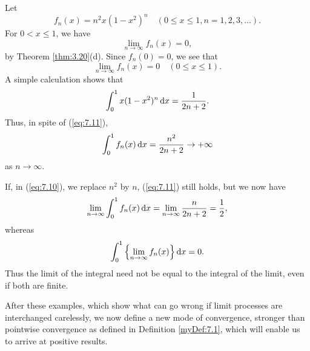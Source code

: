 \begin{myExample}
    \label{myExample:7.6}
    Let 
    \begin{equation}
        \label{eq:7.10}
        f_n(x) = n^2 x(1-x^2)^n
        \quad 
        (0 \leq x \leq 1, n = 1,2,3,\dots).
    \end{equation}
    For $0 < x \leq 1$, we have 
    \begin{equation*}
        \lim_{n \to \infty} f_n (x) = 0,
    \end{equation*}
    by Theorem \ref{thm:3.20}(d). Since $f_n(0) = 0$, we see that
    \begin{equation}
        \label{eq:7.11}
        \lim_{n \to \infty} f_n (x) = 0
        \quad 
        (0 \leq x \leq 1).
    \end{equation}
    A simple calculation shows that 
    \begin{equation*}
        \int_{0}^{1} x(1-x^2)^n \d x = \frac{1}{2n+2}.
    \end{equation*}
    Thus, in spite of (\ref{eq:7.11}),
    \begin{equation*}
        \int_{0}^{1} f_n(x) \d x = \frac{n^2}{2n+2} \rightarrow +\infty
    \end{equation*}
    as $n \rightarrow \infty$.

    If, in (\ref{eq:7.10}), we replace $n^2$ by $n$,
    (\ref{eq:7.11}) still holds, but we now have 
    \begin{equation*}
        \lim_{n \to \infty} \int_{0}^{1} f_n (x) \d x = 
        \lim_{n \to \infty} \frac{n}{2n+2} = \frac{1}{2},
    \end{equation*}
    whereas 
    \begin{equation*}
        \int_{0}^{1} \left\{ \lim_{n \to \infty} f_n (x) \right\} \d x = 0.
    \end{equation*}
    Thus the limit of the integral need not be equal to the integral of the limit, even if both are finite.
\end{myExample}
After these examples, which show what can go wrong if limit processes
are interchanged carelessly, 
we now define a new mode of convergence, 
stronger than pointwise convergence as defined in Definition {\ref{myDef:7.1}}, 
which will enable us to arrive at positive results.
